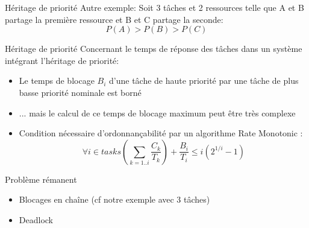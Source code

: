\begin{frame}{Héritage de priorité}
  Autre exemple:
  Soit 3 tâches et 2 ressources telle que A et B partage la première ressource et B et C partage la seconde:
  $$P(A) > P(B) > P(C)$$
  \begin{center}
  \end{center}
\end{frame} 

\begin{frame}{Héritage de priorité} 
  Concernant le temps de réponse  des tâches dans un système intégrant
  l'héritage de priorité:
  \begin{itemize}
  \item Le  temps de blocage $B_i$  d'une tâche de  haute priorité par
    une tâche de plus basse priorité nominale est borné
  \item ...  mais le calcul de  ce temps de blocage  maximum peut être
    très complexe
  \item Condition nécessaire d'ordonnançabilité par un algorithme Rate
    Monotonic :
    $$\forall i \in tasks \left( \sum_{k = 1..i} \frac{C_k}{T_k} \right) + \frac{B_i}{T_i} ≤ i(2^{1/i} - 1)$$
  \end{itemize}
\end{frame}

\begin{frame}{Problème rémanent} 
  \begin{itemize}
  \item Blocages en chaîne (cf notre exemple avec 3 tâches)
  \item Deadlock
  \end{itemize}
\end{frame}

